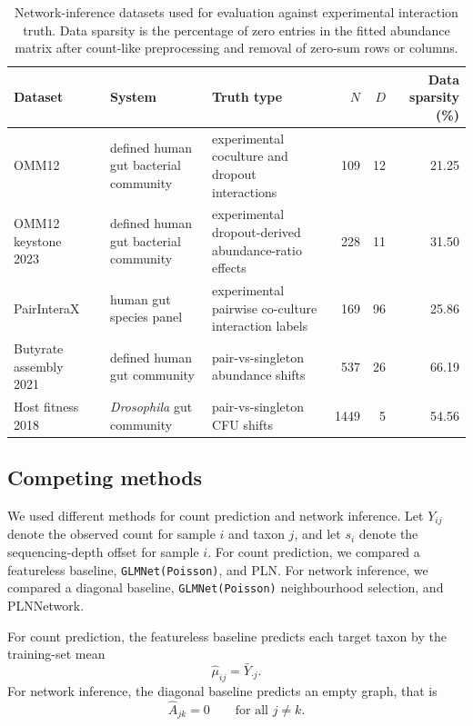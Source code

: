\documentclass{jmlr}
\begin{document}
\begin{table}[htbp]
\caption{Network-inference datasets used for evaluation against experimental interaction truth.
Data sparsity is the percentage of zero entries in the fitted abundance matrix after count-like preprocessing and removal of zero-sum rows or columns.}
\label{tab:network-datasets}
\centering
\scriptsize
\begin{tabular}{>{\raggedright\arraybackslash}p{}>{\raggedright\arraybackslash}p{}>{\raggedright\arraybackslash}p{}rrr}
\toprule
Dataset & System & Truth type & $N$ & $D$ & Data sparsity (\%) \\
\midrule
OMM12~\cite{Weiss2022OMM12} & defined human gut bacterial community & experimental coculture and dropout interactions & 109 & 12 & 21.25 \\
OMM12 keystone 2023~\cite{Weiss2023Keystone} & defined human gut bacterial community & experimental dropout-derived abundance-ratio effects & 228 & 11 & 31.50 \\
PairInteraX~\cite{Zhu2025PairInteraX} & human gut species panel & experimental pairwise co-culture interaction labels & 169 & 96 & 25.86 \\
Butyrate assembly 2021~\cite{Clark2021Butyrate} & defined human gut community & pair-vs-singleton abundance shifts & 537 & 26 & 66.19 \\
Host fitness 2018~\cite{Gould2018HostFitness} & \textit{Drosophila} gut community & pair-vs-singleton CFU shifts & 1449 & 5 & 54.56 \\
\bottomrule
\end{tabular}
\end{table}



\subsection{Competing methods}
\label{subsec:algorithms}

We used different methods for count prediction and network inference.
Let $Y_{ij}$ denote the observed count for sample $i$ and taxon $j$, and let $s_i$ denote the sequencing-depth offset for sample $i$.
For count prediction, we compared a featureless baseline, \texttt{GLMNet(Poisson)}, and PLN.
For network inference, we compared a diagonal baseline, \texttt{GLMNet(Poisson)} neighbourhood selection, and PLNNetwork.

For count prediction, the featureless baseline predicts each target taxon by the training-set mean
\[
\hat{\mu}_{ij} = \bar{Y}_{\cdot j}.
\]
For network inference, the diagonal baseline predicts an empty graph, that is
\[
\hat{A}_{jk} = 0 \qquad \text{for all } j \neq k.
\]
\end{document}
